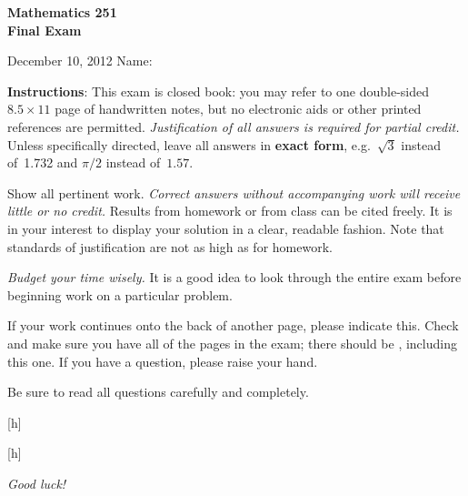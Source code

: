 \documentclass[12pt]{exam}
\begin{document}
\addpoints

\noindent
\textbf{{\large Mathematics 251 \\ Final Exam}}

\noindent
December 10, 2012  \hfill Name: \underline{\hspace{3in}}

\noindent
\textbf{Instructions}: This exam is closed book: you may refer to one double-sided $8.5 \times 11$ page of handwritten notes, but no electronic aids or
other printed references are permitted. \emph{Justification of all answers is required
for partial credit.} Unless
specifically directed, leave all answers in \textbf{exact form}, e.g.\
$\sqrt{3}$ instead of~1.732 and $\pi/2$ instead of~$1.57$.

Show all pertinent work. \emph{Correct answers without accompanying work will receive little or no credit.} Results from homework or from class can be cited freely. It is in your interest to display your solution in a
clear, readable fashion. Note that standards of justification are not as high as for homework.

\emph{Budget your time wisely.} It is a good idea to look through the entire exam before beginning work on a particular problem.

If your work continues onto the back of another page, please indicate
this. Check and make sure you have all of the pages in the
exam; there should be \numpages, including this one. If you have a
question, please raise your hand.

Be sure to read all questions carefully and completely.

\vspace*{1.0in}

\begin{center}
[h] %

[h]
\end{center}

\vspace*{0.5in}

\begin{center}
{\Large \emph{Good luck!}}
\end{center}

\newpage
\end{document}
